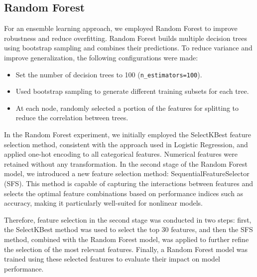 \documentclass[12pt,a4paper]{article}
\begin{document}
\subsection{Random Forest}
For an ensemble learning approach, we employed Random Forest to improve robustness and reduce overfitting. Random Forest builds multiple decision trees using bootstrap sampling and combines their predictions. To reduce variance and improve generalization, the following configurations were made:
\begin{itemize}
    \item Set the number of decision trees to 100 (\texttt{n\_estimators=100}).
    \item Used bootstrap sampling to generate different training subsets for each tree.
    \item At each node, randomly selected a portion of the features for splitting to reduce the correlation between trees.
\end{itemize}

In the Random Forest experiment, we initially employed the SelectKBest feature selection method, consistent with the approach used in Logistic Regression, and applied one-hot encoding to all categorical features. Numerical features were retained without any transformation. In the second stage of the Random Forest model, we introduced a new feature selection method: SequentialFeatureSelector (SFS). This method is capable of capturing the interactions between features and selects the optimal feature combinations based on performance indices such as accuracy, making it particularly well-suited for nonlinear models.

Therefore, feature selection in the second stage was conducted in two steps: first, the SelectKBest method was used to select the top 30 features, and then the SFS method, combined with the Random Forest model, was applied to further refine the selection of the most relevant features. Finally, a Random Forest model was trained using these selected features to evaluate their impact on model performance.
\end{document}
